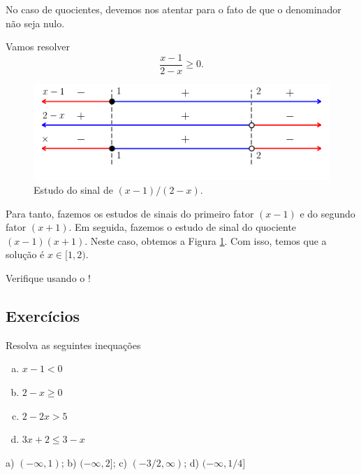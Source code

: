 No caso de quocientes, devemos nos atentar para o fato de que o denominador não seja nulo.

\begin{ex}
  Vamos resolver
  \begin{equation}
    \frac{x - 1}{2 - x} \geq 0.
  \end{equation}
  
  \begin{figure}[H]
    \centering
    \includegraphics{./cap_ineq/dados/fig_ex_ineq_qg1/fig}
    \caption{Estudo do sinal de $(x-1)/(2-x)$.}
    \label{fig:ex_ineq_qg1}
  \end{figure}  

  Para tanto, fazemos os estudos de sinais do primeiro fator $(x-1)$ e do segundo fator $(x+1)$. Em seguida, fazemos o estudo de sinal do quociente $(x-1)(x+1)$. Neste caso, obtemos a Figura \ref{fig:ex_ineq_qg1}. Com isso, temos que a solução é $x\in [1, 2)$.

  \begin{ifispython}
    Verifique usando o {\sympy}!
  \end{ifispython}
\end{ex}

\subsection*{Exercícios}

\begin{exer}
  Resolva as seguintes inequações
  \begin{enumerate}[a)]
  \item $x - 1 < 0$
  \item $2 - x \geq 0$
  \item $2 - 2x > 5$
  \item $3x + 2 \leq 3 - x$
  \end{enumerate}
\end{exer}
\begin{resp}
  a) $(-\infty, 1)$; b) $(-\infty, 2]$; c) $(-3/2, \infty)$; d) $(-\infty, 1/4]$
\end{resp}

